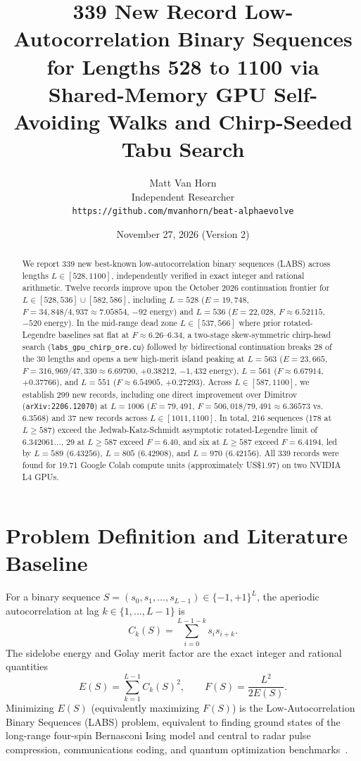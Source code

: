 \documentclass[10.5pt,letterpaper]{article}
\title{339 New Record Low-Autocorrelation Binary Sequences for Lengths 528 to 1100 via Shared-Memory GPU Self-Avoiding Walks and Chirp-Seeded Tabu Search}
\author{Matt Van Horn\\
\small Independent Researcher\\
\small \texttt{https://github.com/mvanhorn/beat-alphaevolve}}
\date{November 27, 2026 (Version 2)}
\begin{document}
\maketitle

\begin{abstract}
We report 339 new best-known low-autocorrelation binary sequences (LABS) across lengths $L \in [528, 1100]$, independently verified in exact integer and rational arithmetic. Twelve records improve upon the October 2026 continuation frontier for $L \in [528, 536] \cup [582, 586]$, including $L = 528$ ($E = 19{,}748$, $F = 34{,}848/4{,}937 \approx 7.05854$, $-92$ energy) and $L = 536$ ($E = 22{,}028$, $F \approx 6.52115$, $-520$ energy). In the mid-range dead zone $L \in [537, 566]$ where prior rotated-Legendre baselines sat flat at $F \approx 6.26$--$6.34$, a two-stage skew-symmetric chirp-head search (\texttt{labs\_gpu\_chirp\_ore.cu}) followed by bidirectional continuation breaks 28 of the 30 lengths and opens a new high-merit island peaking at $L = 563$ ($E = 23{,}665$, $F = 316{,}969/47{,}330 \approx 6.69700$, $+0.38212$, $-1{,}432$ energy), $L = 561$ ($F \approx 6.67914$, $+0.37766$), and $L = 551$ ($F \approx 6.54905$, $+0.27293$). Across $L \in [587, 1100]$, we establish 299 new records, including one direct improvement over Dimitrov (\texttt{arXiv:2206.12070}) at $L = 1006$ ($E = 79{,}491$, $F = 506{,}018/79{,}491 \approx 6.36573$ vs.\ $6.3568$) and 37 new records across $L \in [1011, 1100]$. In total, 216 sequences (178 at $L \ge 587$) exceed the Jedwab-Katz-Schmidt asymptotic rotated-Legendre limit of $6.342061\dots$, 29 at $L \ge 587$ exceed $F = 6.40$, and six at $L \ge 587$ exceed $F = 6.4194$, led by $L = 589$ ($6.43256$), $L = 805$ ($6.42908$), and $L = 970$ ($6.42156$). All 339 records were found for 19.71 Google Colab compute units (approximately US\$1.97) on two NVIDIA L4 GPUs.
\end{abstract}

\section{Problem Definition and Literature Baseline}

For a binary sequence $S = (s_0, s_1, \dots, s_{L-1}) \in \{-1, +1\}^L$, the aperiodic autocorrelation at lag $k \in \{1, \dots, L-1\}$ is
\[
C_k(S) = \sum_{i=0}^{L-1-k} s_i s_{i+k}.
\]
The sidelobe energy and Golay merit factor are the exact integer and rational quantities
\[
E(S) = \sum_{k=1}^{L-1} C_k(S)^2, \qquad F(S) = \frac{L^2}{2 E(S)}.
\]
Minimizing $E(S)$ (equivalently maximizing $F(S)$) is the Low-Autocorrelation Binary Sequences (LABS) problem, equivalent to finding ground states of the long-range four-spin Bernasconi Ising model and central to radar pulse compression, communications coding, and quantum optimization benchmarks~\cite{golay1977,bernasconi1987,packebusch2016}.
\end{document}
